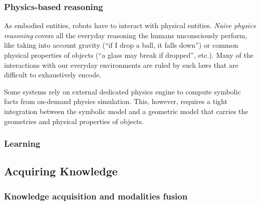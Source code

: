 
\subsubsection{Physics-based reasoning}
\label{sect|physics}

As embodied entities, robots have to interact with physical entities.
\emph{Naive physics reasoning} covers all the everyday reasoning the humans
unconsciously perform, like taking into account gravity (``if I drop a ball, it
falls down'') or common physical properties of objects (``a glass may break if
dropped'', etc.). Many of the interactions with our everyday environments are
ruled by such laws that are difficult to exhaustively encode.

Some systems \cite{Kunze2011a} rely on external dedicated physics engine to
compute symbolic facts from on-demand physics simulation. This, however,
requires a tight integration between the symbolic model and a geometric model
that carries the geometries and physical properties of objects.

\subsubsection{Learning}
\label{sect|learning}

\subsection{Acquiring Knowledge}

\begin{scriptsize}
\begin{center}
\end{center}
\end{scriptsize}

\subsubsection{Knowledge acquisition and modalities fusion}
\label{sect|knowledge-acquisition}

